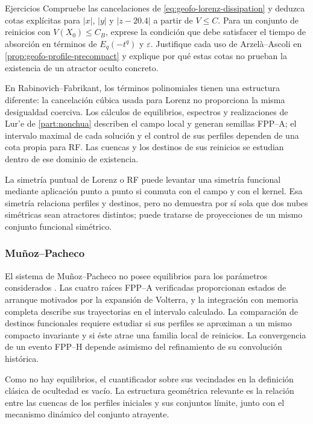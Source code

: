 \ifHAFOPedagogy
\begin{bloqueestudio}{Ejercicios}
Compruebe las cancelaciones de \cref{eq:geofo-lorenz-dissipation} y deduzca
cotas explícitas para \(|x|\), \(|y|\) y \(|z-20.4|\) a partir de
\(V\leq C\). Para un conjunto de reinicios con \(V(X_0)\leq C_B\),
exprese la condición que debe satisfacer el tiempo de absorción en términos
de \(E_q(-t^q)\) y \(\varepsilon\). Justifique cada uso de
Arzelà--Ascoli en \cref{prop:geofo-profile-precompact} y explique por qué
estas cotas no prueban la existencia de un atractor oculto concreto.
\end{bloqueestudio}
\fi

En Rabinovich--Fabrikant, los términos polinomiales tienen una estructura
diferente: la cancelación cúbica usada para Lorenz no proporciona la misma
desigualdad coerciva. Los cálculos de equilibrios, espectros y realizaciones
de Lur'e de \cref{part:nonchua} describen el campo local y generan semillas
FPP--A; el intervalo maximal de cada solución y el control de sus perfiles
dependen de una cota propia para RF. Las cuencas y los destinos de sus
reinicios se estudian dentro de ese dominio de existencia.

La simetría puntual de Lorenz o RF puede levantar una simetría funcional
mediante aplicación punto a punto si conmuta con el campo y con el kernel. Esa
simetría relaciona perfiles y destinos, pero no demuestra por sí sola que dos
nubes simétricas sean atractores distintos; puede tratarse de proyecciones de
un mismo conjunto funcional simétrico.

\subsubsection{Muñoz--Pacheco}

El sistema de Muñoz--Pacheco no posee equilibrios para los parámetros
considerados \cite{munoz2018}. Las cuatro raíces FPP--A verificadas
proporcionan estados de arranque motivados por la expansión de Volterra, y
la integración con memoria completa describe sus trayectorias en el
intervalo calculado. La comparación de destinos funcionales requiere
estudiar si sus perfiles se aproximan a un mismo compacto invariante y si
éste atrae una familia local de reinicios. La convergencia de un evento
FPP--H depende asimismo del refinamiento de su convolución histórica.

Como no hay equilibrios, el cuantificador sobre sus vecindades en la
definición clásica de ocultedad es vacío. La estructura geométrica relevante
es la relación entre las cuencas de los perfiles iniciales y sus conjuntos
límite, junto con el mecanismo dinámico del conjunto atrayente.

